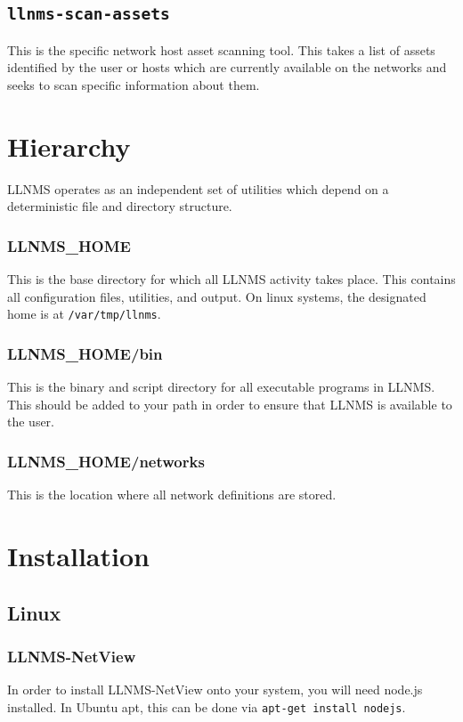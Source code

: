 \documentclass[12pt]{report}
\begin{document}
\subsection*{\texttt{llnms-scan-assets}}
This is the specific network host asset scanning tool.  This takes a list of assets identified by the user or
hosts which are currently available on the networks and seeks to scan specific information about them.

\section*{Hierarchy}

LLNMS operates as an independent set of utilities which depend on 
a deterministic file and directory structure. 

\subsubsection*{LLNMS\_HOME}
This is the base directory for which all LLNMS activity takes place.  This
contains all configuration files, utilities, and output.  On linux systems, 
the designated home is at \texttt{/var/tmp/llnms}. 

\subsubsection*{LLNMS\_HOME/bin}
This is the binary and script directory for all executable programs in LLNMS.  This
should be added to your path in order to ensure that LLNMS is available to the user.

\subsubsection*{LLNMS\_HOME/networks}
This is the location where all network definitions are stored.

\section*{Installation}

\subsection*{Linux}

\subsubsection*{LLNMS-NetView}
In order to install LLNMS-NetView onto your system, you will need node.js installed. In Ubuntu apt, 
this can be done via \texttt{apt-get install nodejs}.
\end{document}
